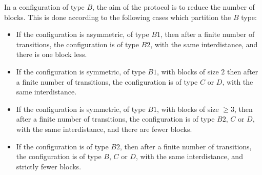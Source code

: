 In a configuration of type $B$, the aim of the protocol is to reduce
the number of blocks. This is done according to the following cases
which partition the $B$ type: 
\begin{itemize}%
\item
If the configuration is asymmetric, of type $B1$, then after a finite
number of transitions, the configuration is of type $B2$, with the
same interdistance, and there is one block less.
\item
If the configuration is symmetric, of type $B1$, with blocks of size
$2$ then after a finite number of transitions, the configuration is of
type $C$ or $D$, with the same interdistance.
\item
If the configuration is symmetric, of type $B1$, with blocks of size
$\geq 3$, then after a finite number of transitions, the configuration
is of type $B2$, $C$ or $D$, with the same interdistance, and there
are fewer blocks.
\item
If the configuration is of type $B2$, then after a finite number of
transitions, the configuration is of type $B$, $C$ or $D$, with the
same interdistance, and strictly fewer blocks.
\end{itemize}

